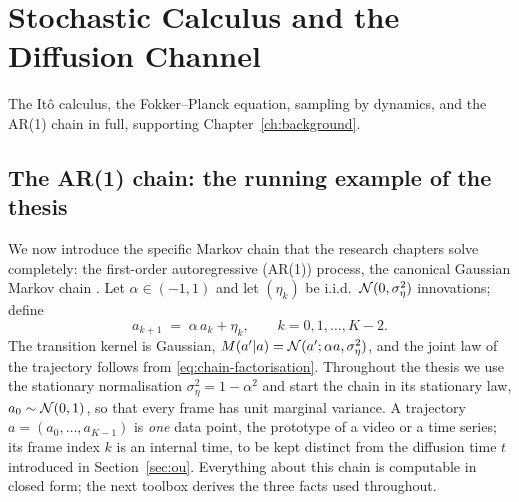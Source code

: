 \chapter{Stochastic Calculus and the Diffusion Channel}
\label{app:stochastic}

The It\^o calculus, the Fokker--Planck equation, sampling by dynamics, and the
AR(1) chain in full, supporting Chapter~\ref{ch:background}.

\section{The AR(1) chain: the running example of the thesis}\label{sec:ar1}

We now introduce the specific Markov chain that the research chapters
solve completely: the first-order autoregressive (AR(1)) process, the
canonical Gaussian Markov chain \citep{brockwell1991time}. Let
$\alpha \in (-1, 1)$ and let $(\eta_k)$ be i.i.d.\
$\mathcal{N}(0, \sigma_\eta^2)$ innovations; define
\begin{equation}
  a_{k+1} \;=\; \alpha\, a_k + \eta_k ,
  \qquad k = 0, 1, \dots, K-2 .
  \label{eq:ar1}
\end{equation}
The transition kernel is Gaussian,
$M(a' | a) = \mathcal{N}(a'; \alpha a, \sigma_\eta^2)$, and the joint law of the
trajectory follows from \eqref{eq:chain-factorisation}. Throughout the
thesis we use the stationary normalisation
$\sigma_\eta^2 = 1 - \alpha^2$ and start the chain in its stationary law,
$a_0 \sim \mathcal{N}(0,1)$, so that every frame has unit marginal variance. A
trajectory $a = (a_0, \dots, a_{K-1})$ is \emph{one} data point, the
prototype of a video or a time series; its frame index $k$ is an internal
time, to be kept distinct from the diffusion time $t$ introduced in
Section~\ref{sec:ou}. Everything about this chain is computable in closed
form; the next toolbox derives the three facts used throughout.

